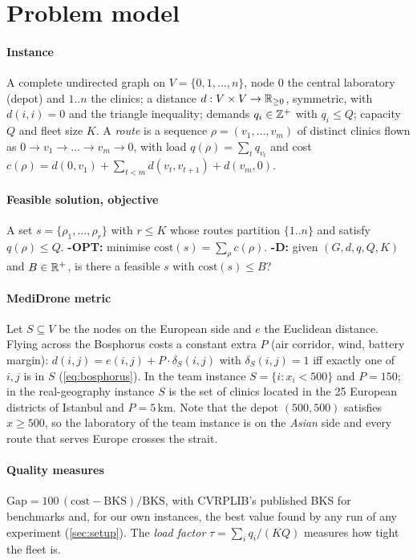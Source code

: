 \section{Problem model}\label{sec:model}
\paragraph{Instance} A complete undirected graph on $V=\{0,1,\dots,n\}$, node $0$ the central
laboratory (depot) and $1..n$ the clinics; a distance $d:V\times V\to\mathbb{R}_{\ge0}$, symmetric, with
$d(i,i)=0$ and the triangle inequality; demands $q_i\in\mathbb{Z}^+$ with $q_i\le Q$; capacity $Q$ and fleet
size $K$. A \emph{route} is a sequence $\rho=(v_1,\dots,v_m)$ of distinct clinics flown as
$0\to v_1\to\dots\to v_m\to0$, with load $q(\rho)=\sum_t q_{v_t}$ and cost
$c(\rho)=d(0,v_1)+\sum_{t<m}d(v_t,v_{t+1})+d(v_m,0)$.

\paragraph{Feasible solution, objective} A set $s=\{\rho_1,\dots,\rho_r\}$ with $r\le K$ whose routes
partition $\{1..n\}$ and satisfy $q(\rho)\le Q$. \textbf{\cvrp-OPT:} minimise $\mathrm{cost}(s)=\sum_\rho c(\rho)$.
\textbf{\cvrp-D:} given $(G,d,q,Q,K)$ and $B\in\mathbb{R}^+$, is there a feasible $s$ with $\mathrm{cost}(s)\le B$?

\paragraph{MediDrone metric} Let $S\subseteq V$ be the nodes on the European side and $e$ the Euclidean
distance. Flying across the Bosphorus costs a constant extra $P$ (air corridor, wind, battery margin):
$d(i,j)=e(i,j)+P\cdot\delta_S(i,j)$ with $\delta_S(i,j)=1$ iff exactly one of $i,j$ is in $S$
(\cref{eq:bosphorus}). In the team instance $S=\{i:x_i<500\}$ and $P=150$; in the real-geography instance
$S$ is the set of clinics located in the 25 European districts of Istanbul and $P=5$\,km.
Note that the depot $(500,500)$ satisfies $x\ge500$, so the laboratory of the team instance is on the
\emph{Asian} side and every route that serves Europe crosses the strait.

\paragraph{Quality measures} $\mathrm{Gap}=100\,(\mathrm{cost}-\mathrm{BKS})/\mathrm{BKS}$, with
CVRPLIB's published BKS for benchmarks and, for our own instances, the best value found by any run of
any experiment (\cref{sec:setup}). The \emph{load factor} $\tau=\sum_iq_i/(KQ)$ measures how tight the
fleet is.
